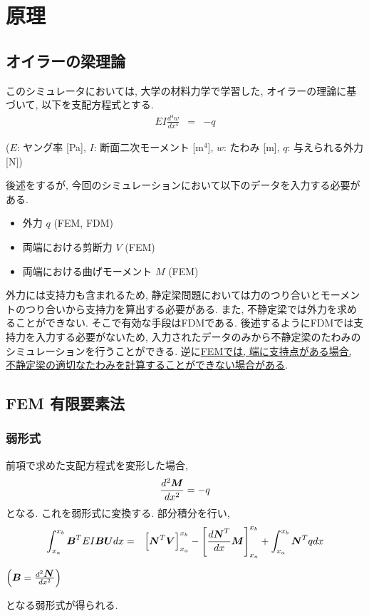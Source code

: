 \documentclass{jsarticle}
\begin{document}
\section{原理}
\subsection{オイラーの梁理論}
このシミュレータにおいては, 大学の材料力学で学習した, オイラーの理論に基づいて, 以下を支配方程式とする.
\begin{eqnarray}
EI\frac{d^4w}{dx^4} &=& -q
\end{eqnarray}
\begin{center}
($E$: ヤング率 [Pa], $I$: 断面二次モーメント [m$^4$], $w$: たわみ [m], $q$: 与えられる外力 [N])
\end{center}

後述をするが, 今回のシミュレーションにおいて以下のデータを入力する必要がある.
\begin{itemize}
\item 外力 $q$ (FEM, FDM)
\item 両端における剪断力 $V$ (FEM)
\item 両端における曲げモーメント $M$ (FEM)
\end{itemize}

外力には支持力も含まれるため, 静定梁問題においては力のつり合いとモーメントのつり合いから支持力を算出する必要がある. また, 不静定梁では外力を求めることができない. そこで有効な手段はFDMである. 後述するようにFDMでは支持力を入力する必要がないため, 入力されたデータのみから不静定梁のたわみのシミュレーションを行うことができる. 逆に\underline{FEMでは, 端に支持点がある場合, 不静定梁の適切なたわみを計算することができない場合がある}.

\subsection{FEM 有限要素法}
\subsubsection{弱形式}
前項で求めた支配方程式を変形した場合,
\begin{eqnarray*}
\frac{d^2\mbox{\boldmath $M$}}{dx^2}=-q
\end{eqnarray*}
となる. これを弱形式に変換する. 部分積分を行い,
\begin{eqnarray*}
\int^{x_b}_{x_a}\mbox{\boldmath $B$}^TEI\mbox{\boldmath $B$}\mbox{\boldmath $U$}dx&=&\left[\mbox{\boldmath $N$}^T\mbox{\boldmath $V$}\right]^{x_b}_{x_a}-\left[\frac{d\mbox{\boldmath $N$}^T}{dx}\mbox{\boldmath $M$}\right]^{x_b}_{x_a}+\int^{x_b}_{x_a}\mbox{\boldmath $N$}^Tqdx
\end{eqnarray*}
\begin{center}
$\left(\mbox{\boldmath $B$}=\frac{d^2\mbox{\boldmath $N$}}{dx^2}\right)$
\end{center}
となる弱形式が得られる.
\end{document}
